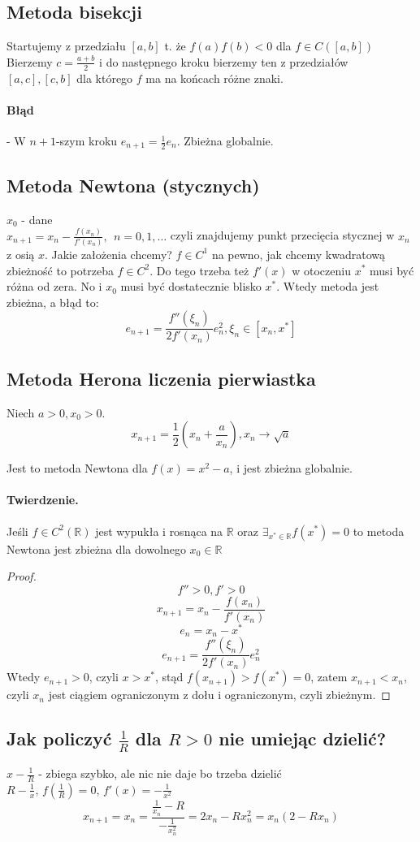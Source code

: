 \documentclass{article}
\begin{document}
\subsection{Metoda bisekcji}
Startujemy z przedziału $ [a,b] $ t. że $ f(a)f(b)<0 $ dla $ f\in C([a,b]) $
Bierzemy $ c=\frac{a+b}{2} $ i do następnego kroku bierzemy ten z przedziałów $ [a,c], [c,b] $ dla którego $ f $ ma na końcach różne znaki.
\paragraph{Błąd} -  W $ n+1 $-szym kroku $ e_{n+1}=\frac12 e_n $.
Zbieżna globalnie.
\subsection{Metoda Newtona (stycznych)}
$ x_0 $ - dane\\
$ x_{n+1} =x_n-\frac{f(x_n)}{f'(x_n)},\ \ n=0,1,\dots$
czyli znajdujemy punkt przecięcia stycznej w $ x_n $ z osią $ x $. 
Jakie założenia chcemy? $ f\in C^1 $ na pewno, jak chcemy kwadratową zbieżność to potrzeba $ f\in C^2 $. Do tego trzeba też $ f'(x) $ w otoczeniu $ x^* $ musi być różna od zera. No i $ x_0 $ musi być dostatecznie blisko $ x^* $. Wtedy metoda jest zbieżna, a błąd to: 
$$ e_{n+1}=\frac{f''(\xi_n)}{2f'(x_n)}e_n^2, \xi_n \in [x_n, x^*] $$
\subsection{Metoda Herona liczenia pierwiastka}
Niech $ a>0, x_0>0 $. 
$$ x_{n+1}=\frac12(x_n+\frac a{x_n}), x_n \rightarrow \sqrt a $$

Jest to metoda Newtona dla $ f(x)=x^2-a $, i jest zbieżna globalnie.
\paragraph{Twierdzenie.} Jeśli $ f \in C^2(\mathbb{R}) $ jest wypukła i rosnąca na $ \mathbb{R} $ oraz $ \exists_{x^*\in\mathbb{R}}f(x^*)=0 $ to metoda Newtona jest zbieżna dla dowolnego $ x_0\in\mathbb{R} $
\begin{proof}
	$$ f''>0, f'>0 $$
	$$x_{n+1}=x_n-\frac{f(x_n)}{f'(x_n)}$$
	$$e_n=x_n-x^*$$
	$$e_{n+1}=\frac{f''(\xi_n)}{2f'(x_n)}e_n^2$$
	Wtedy $ e_{n+1}>0 $, czyli $ x>x^* $, stąd $ f(x_{n+1})>f(x^*)=0 $, zatem $ x_{n+1}<x_n $, czyli $ x_n $ jest ciągiem ograniczonym z dołu i ograniczonym, czyli zbieżnym.
\end{proof}
\subsection{Jak policzyć $\frac{1}{R}$ dla $ R>0 $ nie umiejąc dzielić?}
$ x-\frac1R $ - zbiega szybko, ale nic nie daje bo trzeba dzielić\\
$ R-\frac1x $, $ f(\frac1R)=0 $, $ f'(x)=-\frac1{x^2} $
$$ x_{n+1} = x_n=\frac{\frac{1}{x_n}-R}{-\frac{1}{x^2_n}}=2x_n-Rx_n^2=x_n(2-Rx_n)$$
\end{document}
